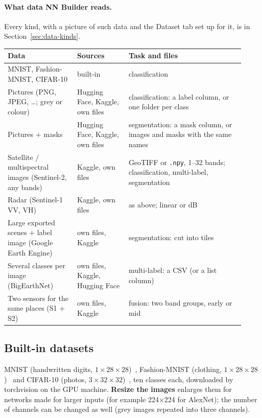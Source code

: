 \documentclass[11pt,a4paper]{article}
\newcommand{\ui}[1]{\textbf{\textsf{#1}}}
\newcommand{\file}[1]{\texttt{#1}}
\begin{document}
\paragraph{What data NN Builder reads.} Every kind, with a picture of such data and the Dataset tab set up for it, is in
Section~\ref{sec:data-kinds}.

\begin{center}\small
\begin{tabular}{@{}p{0.27\linewidth}p{0.2\linewidth}p{0.45\linewidth}@{}}
\toprule
Data & Sources & Task and files \\
\midrule
MNIST, Fashion-MNIST, CIFAR-10 & built-in & classification \\
Pictures (PNG, JPEG, \dots; grey or colour) & Hugging Face, Kaggle, own files & classification: a label column, or one folder per class \\
Pictures + masks & Hugging Face, Kaggle, own files & segmentation: a mask column, or images and masks with the same names \\
Satellite / multispectral images (Sentinel-2, any bands) & Kaggle, own files & GeoTIFF or \file{.npy}, 1--32 bands; classification,
  multi-label, segmentation \\
Radar (Sentinel-1 VV, VH) & Kaggle, own files & as above; linear or dB \\
Large exported scenes + label image (Google Earth Engine) & own files, Kaggle & segmentation: cut into tiles \\
Several classes per image (BigEarthNet) & own files, Kaggle, Hugging Face & multi-label: a CSV (or a list column) \\
Two sensors for the same places (S1 + S2) & own files, Kaggle & fusion: two band groups, early or mid \\
\bottomrule
\end{tabular}
\end{center}

\subsection{Built-in datasets}
MNIST (handwritten digits, $1\times28\times28$)~\cite{lecun1998gradient}, Fashion-MNIST (clothing, $1\times28\times28$)~\cite{xiao2017fashion}
and CIFAR-10 (photos, $3\times32\times32$)~\cite{krizhevsky2009cifar}, ten classes each, downloaded by torchvision on the GPU machine.
\ui{Resize the images} enlarges them for networks made for larger inputs (for example 224$\times$224 for AlexNet); the number of channels
can be changed as well (grey images repeated into three channels).
\end{document}
